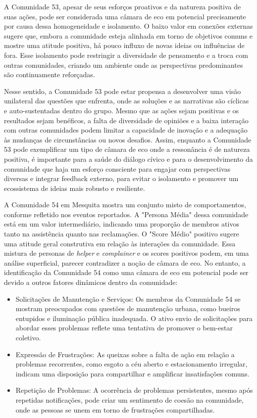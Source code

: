A Comunidade 53, apesar de seus esforços proativos e da natureza positiva de suas ações, pode ser considerada uma câmara de eco em potencial precisamente por causa dessa homogeneidade e isolamento. O baixo valor em conexões externas sugere que, embora a comunidade esteja alinhada em torno de objetivos comuns e mostre uma atitude positiva, há pouco influxo de novas ideias ou influências de fora. Esse isolamento pode restringir a diversidade de pensamento e a troca com outras comunidades, criando um ambiente onde as perspectivas predominantes são continuamente reforçadas.

Nesse sentido, a Comunidade 53 pode estar propensa a desenvolver uma visão unilateral das questões que enfrenta, onde as soluções e as narrativas são cíclicas e auto-sustentadas dentro do grupo. Mesmo que as ações sejam positivas e os resultados sejam benéficos, a falta de diversidade de opiniões e a baixa interação com outras comunidades podem limitar a capacidade de inovação e a adequação às mudanças de circunstâncias ou novos desafios. Assim, enquanto a Comunidade 53 pode exemplificar um tipo de câmara de eco onde a ressonância é de natureza positiva, é importante para a saúde do diálogo cívico e para o desenvolvimento da comunidade que haja um esforço consciente para engajar com perspectivas diversas e integrar feedback externo, para evitar o isolamento e promover um ecossistema de ideias mais robusto e resiliente.

A Comunidade 54 em Mesquita mostra um conjunto misto de comportamentos, conforme refletido nos eventos reportados. A "Persona Média" dessa comunidade está em um valor intermediário, indicando uma proporção de membros ativos tanto na assistência quanto nas reclamações. O "Score Médio" positivo sugere uma atitude geral construtiva em relação às interações da comunidade. Essa mistura de personas de \textit{helper} e \textit{complainer} e os scores positivos podem, em uma análise superficial, parecer contradizer a noção de câmara de eco. No entanto, a identificação da Comunidade 54 como uma câmara de eco em potencial pode ser devido a outros fatores dinâmicos dentro da comunidade:

\begin{itemize}
	\item Solicitações de Manutenção e Serviços: Os membros da Comunidade 54 se mostram preocupados com questões de manutenção urbana, como bueiros entupidos e iluminação pública inadequada. O ativo envio de solicitações para abordar esses problemas reflete uma tentativa de promover o bem-estar coletivo.
	\item Expressão de Frustrações: As queixas sobre a falta de ação em relação a problemas recorrentes, como esgoto a céu aberto e estacionamento irregular, indicam uma disposição para compartilhar e amplificar insatisfações comuns.
	\item Repetição de Problemas: A ocorrência de problemas persistentes, mesmo após repetidas notificações, pode criar um sentimento de coesão na comunidade, onde as pessoas se unem em torno de frustrações compartilhadas.
\end{itemize}

